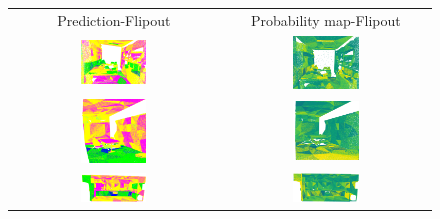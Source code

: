     \begin{figure}[h!]
        \centering
        \begin{tabular}{cc}
            Prediction-Flipout & Probability map-Flipout \\
            \includegraphics[width=0.33\textwidth, height=0.18\textheight]{images/seg_output/s3dis_DE/office_3.png}& 
            \includegraphics[width=0.33\textwidth, height=0.18\textheight]{images/seg_output/s3dis_DE/fout_1.png}\\

            \includegraphics[width=0.33\textwidth, height=0.18\textheight]{images/seg_output/s3dis_DE/ocroom_1.png}& 
            \includegraphics[width=0.33\textwidth, height=0.18\textheight]{images/seg_output/s3dis_DE/fout_2.png}\\

            \includegraphics[width=0.33\textwidth, height=0.18\textheight]{images/seg_output/s3dis_DE/opantry_1.png}& 
            \includegraphics[width=0.33\textwidth, height=0.18\textheight]{images/seg_output/s3dis_DE/fout_3.png}\\


\end{tabular}
\end{figure}
